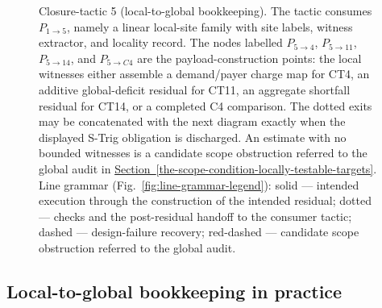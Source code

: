 \documentclass[
  11pt,
]{article}
\theoremstyle{definition}
\newcommand{\secref}[1]{\hyperref[#1]{Section~\ref*{#1}}}
\begin{document}
\begin{figure}[p]
{%
}
\caption[Closure-tactic 5: local-to-global bookkeeping]{Closure-tactic 5 (local-to-global bookkeeping).  The tactic consumes \(P_{1\to5}\), namely a linear local-site family with site labels, witness extractor, and locality record.  The nodes labelled \(P_{5\to4}\), \(P_{5\to11}\), \(P_{5\to14}\), and \(P_{5\to C4}\) are the payload-construction points: the local witnesses either assemble a demand/payer charge map for CT4, an additive global-deficit residual for CT11, an aggregate shortfall residual for CT14, or a completed C4 comparison.  The dotted exits may be concatenated with the next diagram exactly when the displayed S-Trig obligation is discharged.  An estimate with no bounded witnesses is a candidate scope obstruction referred to the global audit in \secref{the-scope-condition-locally-testable-targets}.  Line grammar (Fig.~\ref{fig:line-grammar-legend}): solid --- intended execution through the construction of the intended residual; dotted --- checks and the post-residual handoff to the consumer tactic; dashed --- design-failure recovery; red-dashed --- candidate scope obstruction referred to the global audit.}
\label{fig:ct5-local-global-bookkeeping}
\end{figure}
\FloatBarrier

\subsection*{Local-to-global bookkeeping in practice}
\end{document}
